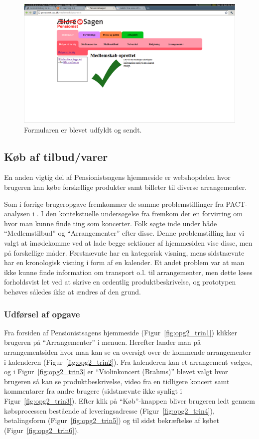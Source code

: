 \begin{figure}[h]
    \centering
    \includegraphics[width=.95\textwidth]{billeder/opgave1_trin4.png}
    \caption{Formularen er blevet udfyldt og sendt.}
    \label{fig:opg1_trin4}
\end{figure}

\subsection{Køb af tilbud/varer}

En anden vigtig del af Pensionistsagens hjemmeside er webshopdelen hvor
brugeren kan købe forskellige produkter samt billeter til diverse
arrangementer.

Som i forrige brugeropgave fremkommer de samme problemstillinger fra
PACT-analysen i \cite{opgave2}. I den kontekstuelle undersøgelse fra
\cite{opgave3} fremkom der en forvirring om hvor man kunne finde ting som
koncerter. Folk søgte inde under både ``Medlemstilbud'' og ``Arrangementer''
efter disse. Denne problemstilling har vi valgt at imødekomme ved at lade
begge sektioner af hjemmesiden vise disse, men på forskellige måder.
Førstnævnte har en kategorisk visning, mens sidstnævnte har en kronologisk
visning i form af en kalender. Et andet problem var at man ikke kunne finde
information om transport o.l. til arrangementer, men dette løses forholdsvist
let ved at skrive en ordentlig produktbeskrivelse, og prototypen behøves
således ikke at ændres af den grund.

\subsubsection{Udførsel af opgave}

Fra forsiden af Pensionistsagens hjemmeside (Figur~\ref{fig:opg2_trin1})
klikker brugeren på ``Arrangementer'' i menuen. Herefter lander man på
arrangementsiden hvor man kan se en oversigt over de kommende arrangementer
i kalenderen (Figur~\ref{fig:opg2_trin2}). Fra kalenderen kan et arrangement
vælges, og i Figur~\ref{fig:opg2_trin3} er ``Violinkoncert (Brahms)''
blevet valgt hvor brugeren så kan se produktbeskrivelse, video fra en
tidligere koncert samt kommentarer fra andre brugere (sidstnævnte ikke
synligt i Figur~\ref{fig:opg2_trin3}). Efter klik på ``Køb''-knappen
bliver brugeren ledt gennem købsprocessen bestående af leveringsadresse
(Figur~\ref{fig:opg2_trin4}), betalingsform (Figur~\ref{fig:opg2_trin5}) og
til sidst bekræftelse af købet (Figur~\ref{fig:opg2_trin6}).

